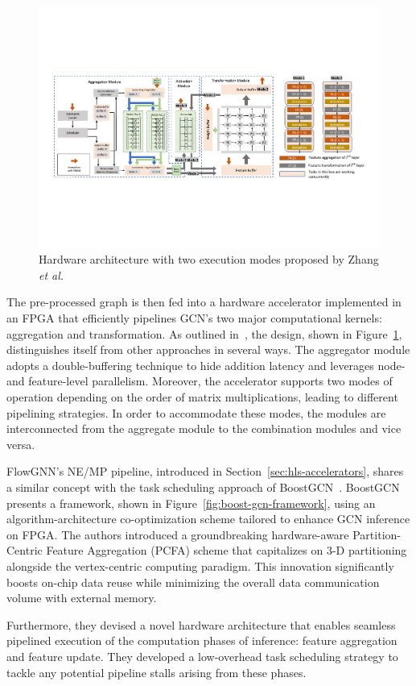 \begin{figure}[t]
    \centering
    \includegraphics[height=0.26\textwidth]{Images/zhang_architecture}
    \caption{Hardware architecture with two execution modes proposed by Zhang \textit{et al.}~\cite{9153263}}
    \label{fig:zhang_architecture}
\end{figure}

The pre-processed graph is then fed into a hardware accelerator implemented in an FPGA that efficiently pipelines GCN's two major computational kernels: aggregation and transformation.
As outlined in~\cite{DBLP:journals/corr/abs-2010-00130}, the design, shown in Figure~\ref{fig:zhang_architecture}, distinguishes itself from other approaches in several ways.
The aggregator module adopts a double-buffering technique to hide addition latency and leverages node- and feature-level parallelism.
Moreover, the accelerator supports two modes of operation depending on the order of matrix multiplications, leading to different pipelining strategies.
In order to accommodate these modes, the modules are interconnected from the aggregate module to the combination modules and vice versa.

FlowGNN's NE/MP pipeline, introduced in Section~\ref{sec:hls-accelerators}, shares a similar concept with the task scheduling approach of BoostGCN~\cite{9444065}.
BoostGCN presents a framework, shown in Figure~\ref{fig:boost-gcn-framework}, using an algorithm-architecture co-optimization scheme tailored to enhance GCN inference on FPGA.
The authors introduced a groundbreaking hardware-aware Partition-Centric Feature Aggregation (PCFA) scheme that capitalizes on 3-D partitioning alongside the vertex-centric computing paradigm.
This innovation significantly boosts on-chip data reuse while minimizing the overall data communication volume with external memory.

Furthermore, they devised a novel hardware architecture that enables seamless pipelined execution of the computation phases of inference: feature aggregation and feature update.
They developed a low-overhead task scheduling strategy to tackle any potential pipeline stalls arising from these phases.

